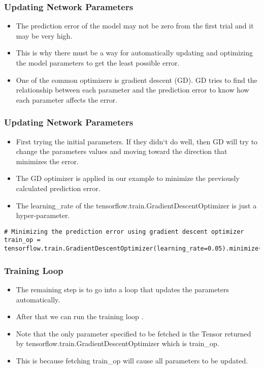 \begin{frame}[fragile] \frametitle{Updating Network Parameters}

\begin{itemize}
\item The prediction error of the model may not be zero from the first trial and it may be very high. 
\item This is why there must be a way for automatically updating and optimizing the model parameters to get the least possible error.
\item One of the common optimizers is gradient descent (GD). GD tries to find the relationship between each parameter and the prediction error to know how each parameter affects the error.
\end{itemize}
\end{frame}


\begin{frame}[fragile] \frametitle{Updating Network Parameters}

\begin{itemize}
\item First trying the initial parameters. If they didn`t do well, then GD will try to change the parameters values and moving toward the direction that minimizes the error. 
\item The GD optimizer is applied in our example to minimize the previously calculated prediction error. 
\item The learning\_rate of the tensorflow.train.GradientDescentOptimizer is just a hyper-parameter.
\end{itemize}
\begin{lstlisting}
# Minimizing the prediction error using gradient descent optimizer  
train_op = tensorflow.train.GradientDescentOptimizer(learning_rate=0.05).minimize(prediction_error) 
\end{lstlisting}
\end{frame}


\begin{frame}[fragile] \frametitle{Training Loop}
\begin{itemize}
\item The remaining step is to go into a loop that updates the parameters automatically.
\item After that we can run the training loop .
\item Note that the only parameter specified to be fetched is the Tensor returned by tensorflow.train.GradientDescentOptimizer which is train\_op.
\item  This is because fetching train\_op will cause all parameters to be updated. 
\end{itemize}
\end{frame}

